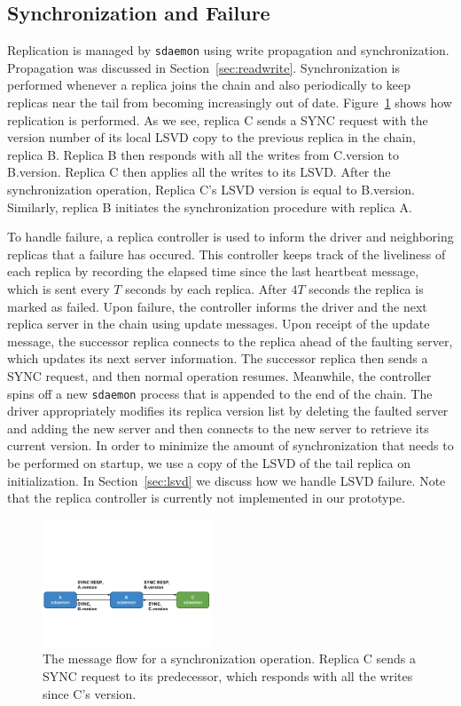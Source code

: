 \subsection{Synchronization and Failure}
\label{sec:replication}
Replication is managed by \texttt{sdaemon} using write propagation and 
synchronization. Propagation was discussed in Section~\ref{sec:readwrite}. 
Synchronization is performed whenever a replica joins the chain and also 
periodically to keep replicas near the tail from becoming increasingly out 
of date. Figure~\ref{fig:sync} shows how replication is performed. As we see,
replica C sends a SYNC request with the version number of its local LSVD 
copy to the previous replica in the chain, replica B. Replica B then responds
with all the writes from C.version to B.version. Replica C then applies all 
the writes to its LSVD. After the synchronization operation, Replica C's 
LSVD version is equal to B.version. Similarly, replica B initiates the 
synchronization procedure with replica A.

To handle failure, a replica controller is used to inform the driver and 
neighboring replicas that a failure has occured. This controller keeps track 
of the liveliness of each replica by recording the elapsed time since the 
last heartbeat message, which is sent every $T$ seconds by each replica. 
After $4T$ seconds the replica is marked as failed. Upon failure, the 
controller informs the driver and the next replica server in the 
chain using update messages. Upon receipt of the update message, the 
successor replica connects to the replica ahead of the faulting server, which
updates its next server information. The successor replica then sends a SYNC 
request, and then normal operation resumes. Meanwhile, the controller spins 
off a new \texttt{sdaemon} process that is appended to the end of the chain. 
The driver appropriately modifies its replica version list by deleting the
faulted server and adding the new server and then connects to the new server
to retrieve its current version.
In order to minimize the amount of synchronization that needs to be 
performed on startup, we use a copy of the LSVD of the tail replica on 
initialization. In Section~\ref{sec:lsvd} we discuss how we handle LSVD
failure. Note that the replica controller is currently not 
implemented in our prototype. 

\begin{figure}[t]
    \includegraphics[width=0.45\textwidth, trim=0 2in 0 3in, clip]{./figures/sync.pdf}
    \caption{The message flow for a synchronization operation. Replica C 
            sends a SYNC request to its predecessor, which responds with all
            the writes since C's version.}
    \label{fig:sync}
\end{figure}


